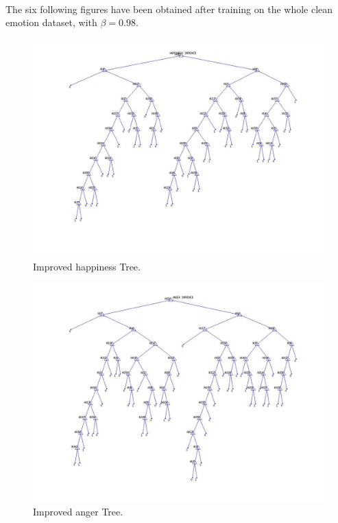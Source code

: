 \documentclass[a4paper,12pt,oneside,final]{report}
\newenvironment{changemargin}[2]{\begin{list}{}{%
\setlength{\topsep}{0pt}%
\setlength{\leftmargin}{0pt}%
\setlength{\rightmargin}{0pt}%
\setlength{\listparindent}{\parindent}%
\setlength{\itemindent}{\parindent}%
\setlength{\parsep}{0pt plus 1pt}%
\addtolength{\leftmargin}{#1}%
\addtolength{\rightmargin}{#2}%
}\item }{\end{list}}
\begin{document}
\begin{appendices}
\paragraph{}
The six following figures have been obtained after training on the whole clean emotion dataset, with $\beta = 0.98$.

\begin{figure}[!h]
\center
\includegraphics[scale=0.35]{happiness_improved.jpg}
\caption{Improved happiness Tree.}
\end{figure}

\begin{figure}[h]
\begin{changemargin}{-20mm}{-20mm}
\begin{center}
\includegraphics[scale=0.5]{anger_improved.jpg}
\end{center}
\caption{Improved anger Tree.}
\end{changemargin}
\end{figure}


\end{appendices}
\end{document}
